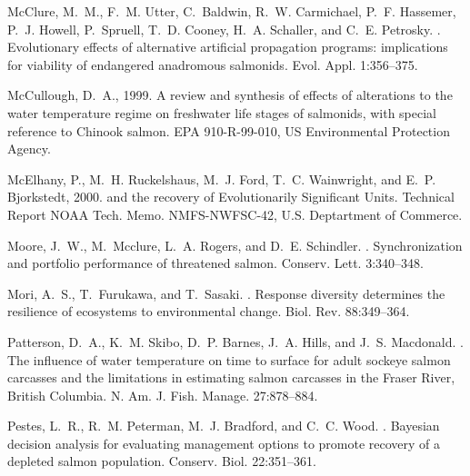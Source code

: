 \documentclass[12pt,english]{article}
\begin{document}
\begin{spacing}{1.9}
\begin{thebibliography}{64}
McClure, M.~M., F.~M. Utter, C.~Baldwin, R.~W. Carmichael, P.~F. Hassemer,
  P.~J. Howell, P.~Spruell, T.~D. Cooney, H.~A. Schaller, and C.~E. Petrosky.
.
\newblock Evolutionary effects of alternative artificial propagation programs:
  implications for viability of endangered anadromous salmonids.
\newblock Evol. Appl. 1:356--375.

McCullough, D.~A., 1999.
\newblock A review and synthesis of effects of alterations to the water
  temperature regime on freshwater life stages of salmonids, with special
  reference to {Chinook} salmon.
\newblock EPA 910-R-99-010, US Environmental Protection Agency.

McElhany, P., M.~H. Ruckelshaus, M.~J. Ford, T.~C. Wainwright, and E.~P.
  Bjorkstedt, 2000.
 and the recovery of {Evolutionarily
  Significant Units}.
\newblock Technical Report NOAA Tech. Memo. NMFS-NWFSC-42, U.S. Deptartment of
  Commerce.

Moore, J.~W., M.~Mcclure, L.~A. Rogers, and D.~E. Schindler.
.
\newblock Synchronization and portfolio performance of threatened salmon.
\newblock Conserv. Lett. 3:340--348.

Mori, A.~S., T.~Furukawa, and T.~Sasaki.
.
\newblock Response diversity determines the resilience of ecosystems to
  environmental change.
\newblock Biol. Rev. 88:349--364.

Patterson, D.~A., K.~M. Skibo, D.~P. Barnes, J.~A. Hills, and J.~S. Macdonald.
.
\newblock The influence of water temperature on time to surface for adult
  sockeye salmon carcasses and the limitations in estimating salmon carcasses
  in the {Fraser River, British Columbia}.
\newblock N. Am. J. Fish. Manage. 27:878--884.

Pestes, L.~R., R.~M. Peterman, M.~J. Bradford, and C.~C. Wood.
.
\newblock Bayesian decision analysis for evaluating management options to
  promote recovery of a depleted salmon population.
\newblock Conserv. Biol. 22:351--361.


\end{thebibliography}
\end{spacing}
\end{document}
